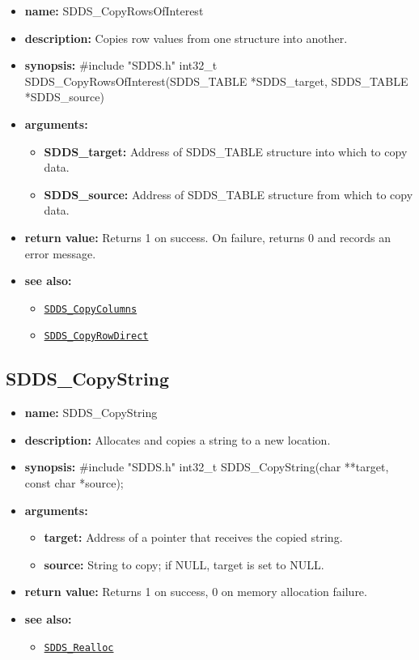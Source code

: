 \documentclass[11pt]{article}
\newcommand{\progref}[1]{\hyperref[SDDS_#1]{\tt SDDS\_#1}}
\begin{document}
\begin{itemize}
\item {\bf name:}\newline
SDDS\_CopyRowsOfInterest
\item {\bf description:}\newline
Copies row values from one structure into another.
\item {\bf synopsis:} \#include "SDDS.h"\newline
int32\_t SDDS\_CopyRowsOfInterest(SDDS\_TABLE *SDDS\_target, SDDS\_TABLE *SDDS\_source)
\item {\bf arguments:}
\begin{itemize}
\item {\bf SDDS\_target:} Address of SDDS\_TABLE structure into which to copy data.
\item {\bf SDDS\_source:} Address of SDDS\_TABLE structure from which to copy data.
\end{itemize}
\item {\bf return value:}\newline
Returns 1 on success. On failure, returns 0 and records an error message.
\item {\bf see also:}
\begin{itemize}
\item \progref{CopyColumns}
\item \progref{CopyRowDirect}
\end{itemize}
\end{itemize}

\subsection{SDDS\_CopyString}
\label{SDDS_CopyString}

\begin{itemize}
\item {\bf name:}\newline
SDDS\_CopyString
\item {\bf description:}\newline
Allocates and copies a string to a new location.
\item {\bf synopsis:} \#include "SDDS.h"\newline
int32\_t SDDS\_CopyString(char **target, const char *source);
\item {\bf arguments:}
\begin{itemize}
\item {\bf target:} Address of a pointer that receives the copied string.
\item {\bf source:} String to copy; if NULL, target is set to NULL.
\end{itemize}
\item {\bf return value:}\newline
Returns 1 on success, 0 on memory allocation failure.
\item {\bf see also:}
\begin{itemize}
\item \progref{Realloc}
\end{itemize}
\end{itemize}
\end{document}
